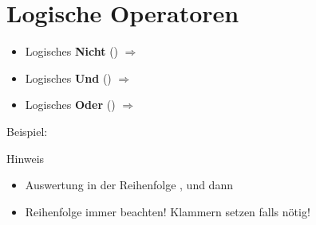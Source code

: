 \section{Logische Operatoren}


\begin{frame}
    \slidehead
    \vspace{-0.1cm}
    \begin{itemize}
        \item Logisches \textbf{Nicht} (\kotlininline{!})  $\Rightarrow$ 
        \item Logisches \textbf{Und} (\kotlininline{&&}) $\Rightarrow$ 
        \item Logisches \textbf{Oder} (\kotlininline{||})  $\Rightarrow$ 
    \end{itemize}
    \vspace{-0.15cm}
    \begin{block}{Beispiel:}
    \end{block}
    \vspace{-0.15cm}
    \begin{block}{Hinweis}
        \begin{itemize}
            \item Auswertung in der Reihenfolge \kotlininline{!}, \kotlininline{&&} und dann \kotlininline{||}
            \item Reihenfolge immer beachten!
            Klammern setzen falls nötig!
        \end{itemize}
    \end{block}
\end{frame}

